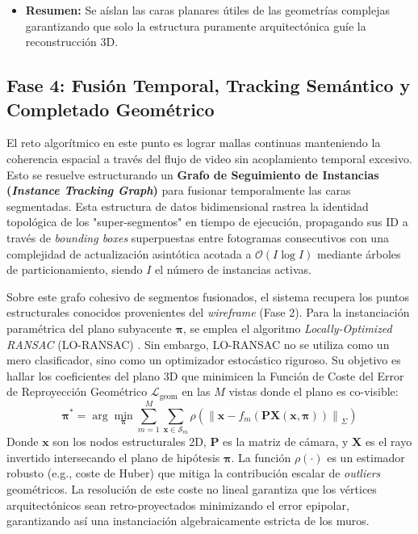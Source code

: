 \begin{itemize}
    \item \textbf{Resumen:} Se aíslan las caras planares útiles de las geometrías complejas garantizando que solo la estructura puramente arquitectónica guíe la reconstrucción 3D.
\end{itemize}

\subsection{Fase 4: Fusión Temporal, Tracking Semántico y Completado Geométrico}
El reto algorítmico en este punto es lograr mallas continuas manteniendo la coherencia espacial a través del flujo de video sin acoplamiento temporal excesivo. Esto se resuelve estructurando un \textbf{Grafo de Seguimiento de Instancias (\textit{Instance Tracking Graph})} para fusionar temporalmente las caras segmentadas. Esta estructura de datos bidimensional rastrea la identidad topológica de los "super-segmentos" en tiempo de ejecución, propagando sus ID a través de \textit{bounding boxes} superpuestas entre fotogramas consecutivos con una complejidad de actualización asintótica acotada a $\mathcal{O}(I \log I)$ mediante árboles de particionamiento, siendo $I$ el número de instancias activas.

Sobre este grafo cohesivo de segmentos fusionados, el sistema recupera los puntos estructurales conocidos provenientes del \textit{wireframe} (Fase 2). Para la instanciación paramétrica del plano subyacente $\boldsymbol{\pi}$, se emplea el algoritmo \textit{Locally-Optimized RANSAC} (LO-RANSAC) \cite{lebeda2012loransac}. Sin embargo, LO-RANSAC no se utiliza como un mero clasificador, sino como un optimizador estocástico riguroso. Su objetivo es hallar los coeficientes del plano 3D que minimicen la Función de Coste del Error de Reproyección Geométrico $\mathcal{L}_{\text{geom}}$ en las $M$ vistas donde el plano es co-visible:
\begin{equation}
    \boldsymbol{\pi}^* = \arg\min_{\boldsymbol{\pi}} \sum_{m=1}^{M} \sum_{\mathbf{x} \in \mathcal{S}_m} \rho \left( \left\| \mathbf{x} - f_m(\mathbf{P} \mathbf{X}(\mathbf{x}, \boldsymbol{\pi})) \right\|_\Sigma \right)
\end{equation}
Donde $\mathbf{x}$ son los nodos estructurales 2D, $\mathbf{P}$ es la matriz de cámara, y $\mathbf{X}$ es el rayo invertido intersecando el plano de hipótesis $\boldsymbol{\pi}$. La función $\rho(\cdot)$ es un estimador robusto (e.g., coste de Huber) que mitiga la contribución escalar de \textit{outliers} geométricos. La resolución de este coste no lineal garantiza que los vértices arquitectónicos sean retro-proyectados minimizando el error epipolar, garantizando así una instanciación algebraicamente estricta de los muros.

